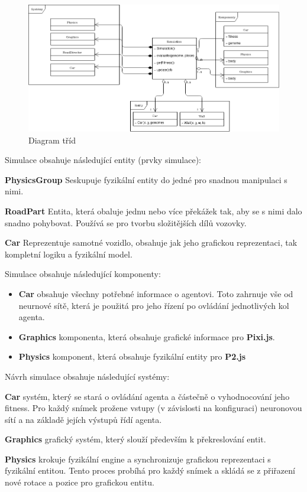 \begin{figure}[H]
	\centering
 	\includegraphics[width=0.7\linewidth]{classDiagram}
	\caption{Diagram tříd}
	\label{fig:class-diagram}
\end{figure}

Simulace obsahuje následující entity (prvky simulace):

\textbf{PhysicsGroup} Seskupuje fyzikální entity do jedné pro snadnou manipulaci s nimi.

\textbf{RoadPart} Entita, která obaluje jednu nebo více překážek tak, aby se s nimi dalo snadno pohybovat. Používá se pro tvorbu složitějších dílů vozovky.

\textbf{Car} Reprezentuje samotné vozidlo, obsahuje jak jeho grafickou reprezentaci, tak kompletní logiku a fyzikální model.

Simulace obsahuje následující komponenty:
\begin{itemize}
	\item \textbf{Car} obsahuje všechny potřebné informace o agentovi. Toto zahrnuje vše od neurnové sítě, která je použitá pro jeho řízení po ovládání jednotlivých kol agenta.
	\item \textbf{Graphics} komponenta, která obsahuje grafické informace pro \textbf{Pixi.js}.
	\item \textbf{Physics} komponent, která obsahuje fyzikální entity pro \textbf{P2.js}
\end{itemize}

Návrh simulace obsahuje následující systémy:

\textbf{Car} systém, který se stará o ovládání agenta a částečně o vyhodnocování jeho fitness. Pro každý snímek prožene vstupy (v závislosti na konfiguraci) neuronovou sítí a na základě jejích výstupů řídí agenta.

\textbf{Graphics} grafický systém, který slouží především k překreslování entit.

\textbf{Physics} krokuje fyzikální engine a synchronizuje grafickou reprezentaci s fyzikální entitou. Tento proces probíhá pro každý snímek a skládá se z přiřazení nové rotace a pozice pro grafickou entitu.

